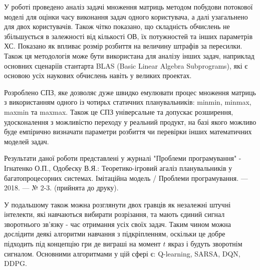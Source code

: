 
У роботі проведено аналіз задачі множення матриць методом побудови потокової моделі для оцінки часу виконання задач одного користувача, а далі узагальнено для двох користувачів. Також чітко показано, що складність обчислень не збільшується в залежності від кількості ОВ, їх потужностей та інших параметрів ХС. Показано як впливає розмір розбиття на величину штрафів за пересилки. Також ця методологія може бути використана для аналізу інших задач, наприклад основних сценаріїв стантарта BLAS (Basic Linear Algebra Subprograms), які є основою усіх наукових обчислень навіть у великих проектах.

Розроблено СПЗ, яке дозволяє дуже швидко емулювати процес множення матриць з використанням одного із чотирьх статичних планувальників: minmin, minmax, maxmin та maxmax. Також це СПЗ універсальне та допускає розширення, удосконалення з можливістю переходу у реальний продукт, на базі якого можливо буде емпірично визначати параметри розбиття чи перевірки інших математичних моделей задач.

Результати даної роботи представлені у журналі "Проблеми програмування" - Ігнатенко О.П., Одобеску В.Я.: Теоретико-ігровий агаліз планувальників у багатопроцесорних системах. Імітаційна модель / Проблеми програмування. — 2018. — № 2-3. (прийнята до друку).

У подальшому також можна розглянути двох гравців як незалежні штучні інтелекти, які навчаються вибирати розрізання, та мають єдиний сигнал зворотнього зв'язку - час отримання усіх своїх задач. Таким чином можна дослідити деякі алгоритми навчання з підкріпленням, оскільки це добре підходить під концепцію гри де виграші на момент $t$ якраз і будуть зворотнім сигналом. Основними алгоритмами у цій сфері є: Q-learning, SARSA, DQN, DDPG.